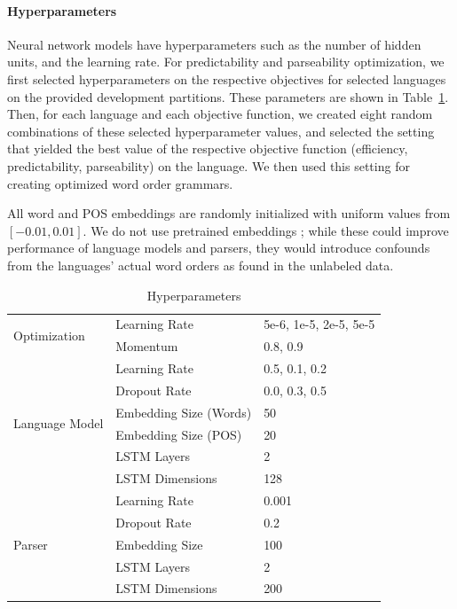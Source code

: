 \documentclass[10pt,twoside,lineno]{article}
\begin{document}
\paragraph{Hyperparameters}
Neural network models have hyperparameters such as the number of hidden units, and the learning rate. 
For predictability and parseability optimization, we first selected hyperparameters on the respective objectives for selected languages on the provided development partitions.
These parameters are shown in Table~\ref{tab:hyperparameters}.
Then, for each language and each objective function, we created eight random combinations of these selected hyperparameter values, and selected the setting that yielded the best value of the respective objective function (efficiency, predictability, parseability) on the language. We then used this setting for creating optimized word order grammars. 




All word and POS embeddings are randomly initialized with uniform values from $[-0.01, 0.01]$.
We do not use pretrained embeddings \citep{peters2018deep}; while these could improve performance of language models and parsers, they would introduce confounds from the languages' actual word orders as found in the unlabeled data.


\begin{table}[]
    \centering
    \begin{tabular}{|l|l|l|}
\hline
\multirow{2}{*}{Optimization}&    Learning Rate     & 5e-6, 1e-5, 2e-5, 5e-5 \\
&    Momentum & 0.8, 0.9 \\ \hline
\multirow{6}{*}{Language Model} &    Learning Rate  & 0.5, 0.1, 0.2 \\
&    Dropout Rate& 0.0, 0.3, 0.5 \\
& Embedding Size (Words) & 50 \\
& Embedding Size (POS) & 20 \\
&    LSTM Layers  & 2 \\
&    LSTM Dimensions  & 128 \\
 \hline
\multirow{5}{*}{Parser}&    Learning Rate  & 0.001 \\
&    Dropout Rate  & 0.2 \\
&    Embedding Size  & 100 \\
&    LSTM Layers  & 2 \\
&    LSTM Dimensions  & 200 \\
\hline
    \end{tabular}
    \caption{Hyperparameters}
    \label{tab:hyperparameters}
\end{table}
\end{document}
